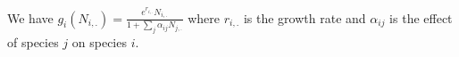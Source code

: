 \documentclass[a4paper,10pt]{article}
\begin{document}
 We have $g_i(N_{i,.})=\frac{e^{r_{i,.}}N_{i,.}}{1+\sum_j\alpha_{ij}N_{j,.}}$ where $r_{i,.}$ is the growth rate and $\alpha_{ij}$ is the effect of species $j$ on species $i$. \\
 
% 
% 
% 
%  
%  

 
   
\end{document}
